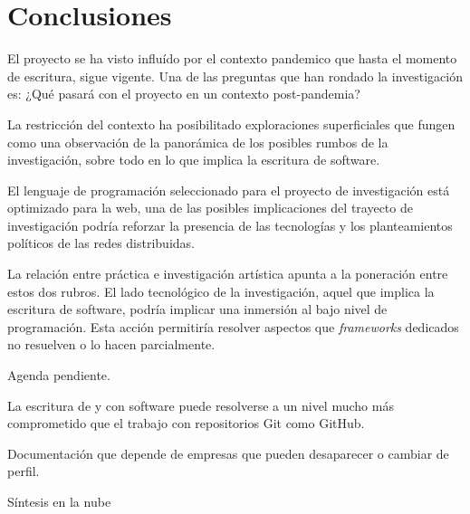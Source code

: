 \section*{Conclusiones}

El proyecto se ha visto influído por el contexto pandemico que hasta el momento de escritura, sigue vigente. Una de las preguntas que han rondado la investigación es: ¿Qué pasará con el proyecto en un contexto post-pandemia? 

La restricción del contexto ha posibilitado exploraciones superficiales que fungen como una observación de la panorámica de los posibles rumbos de la investigación, sobre todo en lo que implica la escritura de software. 

El lenguaje de programación seleccionado para el proyecto de investigación está optimizado para la web, una de las posibles implicaciones del trayecto de investigación podría reforzar la presencia de las tecnologías y los planteamientos políticos de las redes distribuidas. 

La relación entre práctica e investigación artística apunta a la poneración entre estos dos rubros. El lado tecnológico de la investigación, aquel que implica la escritura de software, podría implicar una inmersión al bajo nivel de programación. Esta acción permitiría resolver aspectos que \textit{frameworks} dedicados no resuelven o lo hacen parcialmente. 

Agenda pendiente.

La escritura de y con software puede resolverse a un nivel mucho más comprometido que el trabajo con repositorios Git como GitHub.

Documentación que depende de empresas que pueden desaparecer o cambiar de perfil. 

Síntesis en la nube 
